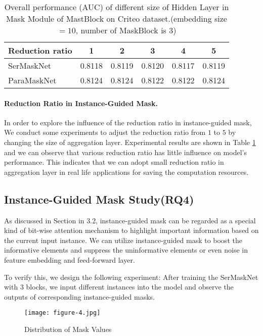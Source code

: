 \documentclass[sigconf]{acmart}
\begin{document}
\begin{table}
  \setlength{\abovecaptionskip}{1pt}
  \caption{Overall performance (AUC) of different size of Hidden Layer in Mask Module of MastBlock on Criteo dataset.(embedding size$=10$, number of MaskBlock is $3$)}
  \label{tab:table7}
  \begin{tabular}{lccccc}
  \toprule
  Reduction   ratio &    1 & 2 & 3 & 4 & 5 \\
  \midrule
   SerMaskNet & 0.8118 & 0.8119 & 0.8120 & 0.8117 & 0.8119 \\
    ParaMaskNet & 0.8124 & 0.8124 & 0.8122 & 0.8122 & 0.8124 \\
  \bottomrule
\end{tabular}
\end{table}

\paragraph{\textbf{Reduction Ratio in Instance-Guided Mask.}} In order to explore the influence of the reduction ratio  in instance-guided mask, We conduct some experiments to adjust the reduction ratio from $1$ to $5$ by changing the size of aggregation layer.  Experimental results are shown in Table \ref{tab:table7} and we can observe that  various reduction ratio has little influence on model's performance. This indicates that we can adopt small reduction ratio in aggregation layer in real life applications for saving the computation resources.



\subsection{Instance-Guided Mask Study(RQ4)}
As discussed in Section in 3.2, instance-guided mask can be regarded as a special kind of bit-wise attention mechanism to highlight important information based on the current input instance. We can utilize instance-guided mask to boost the informative elements and suppress the uninformative elements or even noise in feature embedding and feed-forward layer.


To verify this, we design the following experiment: After training the SerMaskNet with $3$ blocks, we input different  instances into the model and observe the outputs of  corresponding instance-guided masks.



\begin{figure}
  \setlength{\abovecaptionskip}{1pt}
  \texttt{[image: figure-4.jpg]}
  \caption{Distribution of Mask Values}
  \label{Fig.4}
\end{figure}
\end{document}
